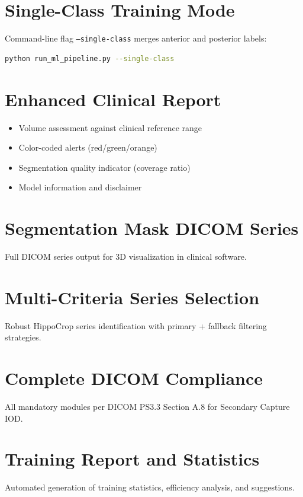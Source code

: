 \documentclass[12pt,a4paper]{report}
\begin{document}
\section{Single-Class Training Mode}
Command-line flag \texttt{--single-class} merges anterior and posterior labels:
\begin{lstlisting}[language=bash]
python run_ml_pipeline.py --single-class
\end{lstlisting}

\section{Enhanced Clinical Report}
\begin{itemize}
    \item Volume assessment against clinical reference range
    \item Color-coded alerts (red/green/orange)
    \item Segmentation quality indicator (coverage ratio)
    \item Model information and disclaimer
\end{itemize}

\section{Segmentation Mask DICOM Series}
Full DICOM series output for 3D visualization in clinical software.

\section{Multi-Criteria Series Selection}
Robust HippoCrop series identification with primary + fallback filtering strategies.

\section{Complete DICOM Compliance}
All mandatory modules per DICOM PS3.3 Section A.8 for Secondary Capture IOD.

\section{Training Report and Statistics}
Automated generation of training statistics, efficiency analysis, and suggestions.


\end{document}
